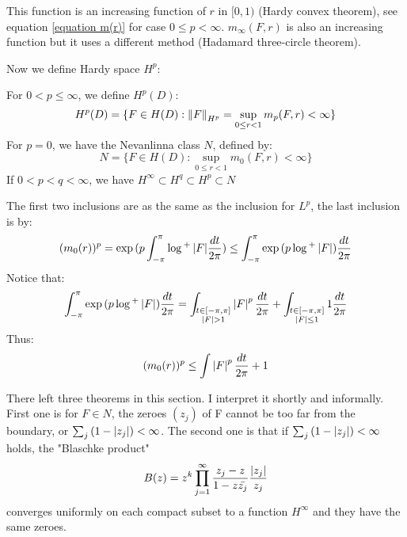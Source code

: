 This function is an increasing function of $r$ in $[0,1)$ (Hardy convex theorem),
see equation \eqref{equation m(r)} for case $0\leq p<\infty$. $m_\infty(F,r)$ is also an increasing function but it uses a different method {\color{blue}(Hadamard three-circle theorem)}. \par
Now we define Hardy space $H^p$:
\begin{definition}
    For $0<p\leq\infty$, we define $H^p(D)$:
    \begin{equation*}
        H^p(D)=\{F\in H(D):\left\lVert F\right\rVert_{H^p}=\sup_{0\leq r<1}{m_p(F,r)<\infty}\}
    \end{equation*}
    For $p=0$, we have the Nevanlinna class $N$, defined by:
    \begin{equation*}
        N=\{F\in H(D):\sup_{0\leq r<1}{m_0(F,r)<\infty}\}
    \end{equation*}
    If $0<p<q<\infty$, we have $H^\infty\subset H^q\subset H^p\subset N$
\end{definition}
\begin{remark}
    The first two inclusions are as the same as the inclusion for $L^p$, the last inclusion is by:
    \begin{equation*}
        (m_0(r))^p=\exp{(p\int_{-\pi}^{\pi}{\log{^+\left\lvert F\right\rvert}\frac{dt}{2\pi}})}\leq\int_{-\pi}^{\pi}{\exp{(p\log{^+\left\lvert F\right\rvert})\frac{dt}{2\pi}}}
    \end{equation*}
    Notice that:
    \begin{equation*}
        \int_{-\pi}^{\pi}{\exp{(p\log{^+\left\lvert F\right\rvert})\frac{dt}{2\pi}}}=\int_{\substack{t\in [-\pi,\pi]\\ \left\lvert F\right\rvert> 1}}{\left\lvert F\right\rvert^p \frac{dt}{2\pi}}+\int_{\substack{t\in [-\pi,\pi]\\ \left\lvert F\right\rvert\leq 1}}{1 \frac{dt}{2\pi}}
    \end{equation*}
    Thus:
    \begin{equation*}
        (m_0(r))^p\leq\int{\left\lvert F\right\rvert^p\frac{dt}{2\pi}}+1
    \end{equation*}
\end{remark}
There left three theorems in this section. I interpret it shortly and informally. First one is for $F\in N$, the zeroes $(z_j)$
of F cannot be too far from the boundary, or $\sum_j{(1-\left\lvert z_j\right\rvert)<\infty}$. The second one is that if $\sum_j{(1-\left\lvert z_j\right\rvert)<\infty}$ holds, the "Blaschke product"
\begin{equation*}
    B(z)=z^k\prod_{j=1}^\infty{\frac{z_j-z}{1-z\bar{z_j}}\frac{\left\lvert z_j\right\rvert}{z_j}}
\end{equation*}
converges uniformly on each compact subset to a function $H^\infty$ and they have the same zeroes.\par
